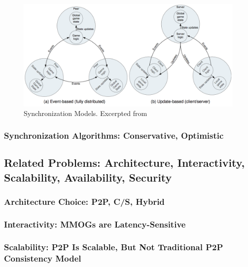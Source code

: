 \documentclass{article}
\begin{document}
\begin{figure}
\begin{center}
\includegraphics[scale=0.3]{images/sm.png}
\caption{Synchronization Models. Excerpted from \cite{Gilmore12}}
\label{fig:sm}
\end{center}
\end{figure}

\subsubsection{Synchronization Algorithms: Conservative, Optimistic}
\label{sec:sa}

\subsection{Related Problems: Architecture, Interactivity, Scalability, Availability, Security}
\label{sec:rp}

\subsubsection{Architecture Choice: P2P, C/S, Hybrid}

\subsubsection{Interactivity: MMOGs are Latency-Sensitive}

\subsubsection{Scalability: P2P Is Scalable, But Not Traditional P2P Consistency Model}
\end{document}
